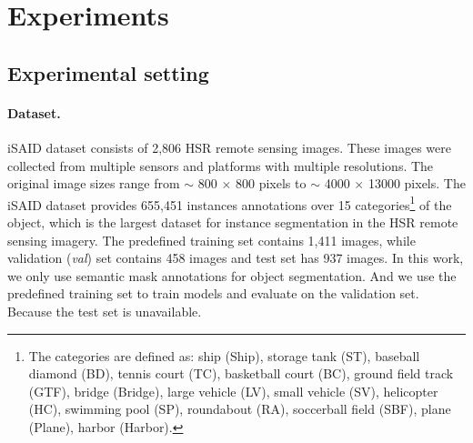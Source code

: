 \documentclass[10pt,twocolumn,letterpaper]{article}
\begin{document}
 
\begin{table}[]
   \caption{Candidates of annealing functions.
      \label{tab:annealing_func}}
   \centering
   \renewcommand{\arraystretch}{1.5}
\end{table}

\section{Experiments}
\label{sec:exp}

\subsection{Experimental setting}

\paragraph{Dataset.}

iSAID \cite{waqas2019isaid} dataset consists of 2,806 HSR remote sensing images.
These images were collected from multiple sensors and platforms with multiple resolutions.
The original image sizes range from $\sim$ 800 $\times$ 800 pixels to $\sim$ 4000 $\times$ 13000 pixels.
The iSAID dataset provides 655,451 instances annotations over 15 categories\footnote{The categories are defined as: ship (Ship), storage tank (ST), baseball diamond (BD), tennis court (TC), basketball court (BC), ground field track (GTF), bridge (Bridge), large vehicle (LV), small vehicle (SV), helicopter (HC), swimming pool (SP), roundabout (RA), soccerball field (SBF), plane (Plane), harbor (Harbor).}
of the object, which is the largest dataset for instance segmentation in the HSR remote sensing imagery.
The predefined training set contains 1,411 images, while validation (\textit{val}) set contains 458 images and test set has 937 images.
In this work, we only use semantic mask annotations for object segmentation.
And we use the predefined training set to train models and evaluate on the validation set.
Because the test set is unavailable.
\end{document}
